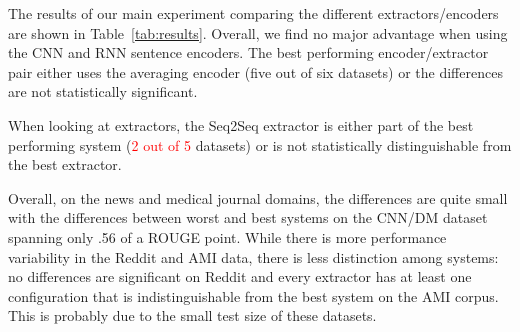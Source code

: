 

The results of our main experiment comparing 
the different extractors/encoders are shown in 
Table~\ref{tab:results}.
Overall, we find no major advantage when using the CNN and RNN sentence
encoders. The best performing encoder/extractor pair either 
uses the averaging 
encoder (five out of six datasets) or the differences 
are not statistically significant. %



When looking at extractors, the Seq2Seq extractor is either part of 
the best performing system (\textcolor{red}{2 out of 5} datasets) or is not 
statistically distinguishable from the best extractor. 

Overall, on the news and medical journal domains, the differences are 
quite small with the 
differences between worst and best systems on the CNN/DM dataset 
spanning only .56 of a ROUGE point. While there is more performance variability
 in the Reddit and AMI data, there is less distinction among systems: 
 no differences are significant on Reddit
and every extractor has at least one configuration that is indistinguishable
from the best system on the AMI corpus. This is probably due to the small test
size of these datasets.





